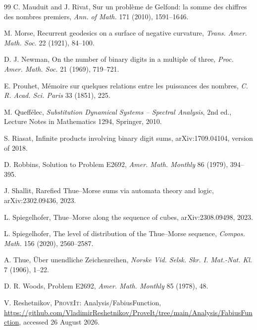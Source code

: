 \documentclass[11pt,oneside]{article}
\numberwithin{equation}{section}
\theoremstyle{definition}
\theoremstyle{remark}
\newcommand{\repo}{\textsc{ProveIt}}
\begin{document}
\begin{thebibliography}{99}
C. Mauduit and J. Rivat,
Sur un probl\`eme de Gelfond: la somme des chiffres des nombres premiers,
\emph{Ann. of Math.} 171 (2010), 1591--1646.

M. Morse,
Recurrent geodesics on a surface of negative curvature,
\emph{Trans. Amer. Math. Soc.} 22 (1921), 84--100.

D. J. Newman,
On the number of binary digits in a multiple of three,
\emph{Proc. Amer. Math. Soc.} 21 (1969), 719--721.

E. Prouhet,
M\'emoire sur quelques relations entre les puissances des nombres,
\emph{C. R. Acad. Sci. Paris} 33 (1851), 225.

M. Queff\'elec,
\emph{Substitution Dynamical Systems -- Spectral Analysis},
2nd ed., Lecture Notes in Mathematics 1294, Springer, 2010.

S. Riasat,
Infinite products involving binary digit sums,
arXiv:1709.04104, version of 2018.

D. Robbins,
Solution to Problem E2692,
\emph{Amer. Math. Monthly} 86 (1979), 394--395.

J. Shallit,
Rarefied Thue--Morse sums via automata theory and logic,
arXiv:2302.09436, 2023.

L. Spiegelhofer,
Thue--Morse along the sequence of cubes,
arXiv:2308.09498, 2023.

L. Spiegelhofer,
The level of distribution of the Thue--Morse sequence,
\emph{Compos. Math.} 156 (2020), 2560--2587.

A. Thue,
\"Uber unendliche Zeichenreihen,
\emph{Norske Vid. Selsk. Skr. I. Mat.-Nat. Kl.} 7 (1906), 1--22.

D. R. Woods,
Problem E2692,
\emph{Amer. Math. Monthly} 85 (1978), 48.

V. Reshetnikov,
\repo: Analysis/FabiusFunction,
\url{https://github.com/VladimirReshetnikov/ProveIt/tree/main/Analysis/FabiusFunction},
accessed 26 August 2026.

\end{thebibliography}
\end{document}
